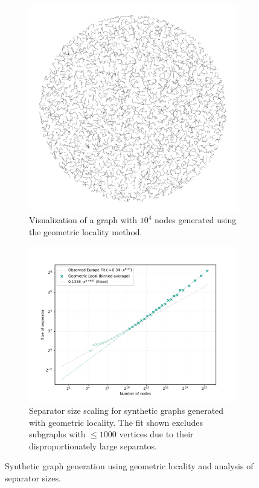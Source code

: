 \begin{figure}[tbhp]
	\begin{subfigure}{0.35\linewidth}
		\centering
		\includegraphics[width=\linewidth]{graphics/local_embedding.png}
        \caption{Visualization of a graph with \(10^4\) nodes generated using the geometric locality method.}
		\label{fig:geometric_locality_graph_viz}
	\end{subfigure}
	\hfill
	\begin{subfigure}{0.55\linewidth}
		\centering
		\includegraphics[width=\linewidth]{graphics/sep_local_embedding.pdf}
		\caption{Separator size scaling for synthetic graphs generated with geometric locality. The fit shown excludes subgraphs with \( \le 1000 \) vertices due to their disproportionately large separatos. }
		\label{fig:geometric_locality_sep_plot}
	\end{subfigure}
	\caption{Synthetic graph generation using geometric locality and analysis of separator sizes. }
	\label{fig:geometric_locality_separators}
\end{figure}

